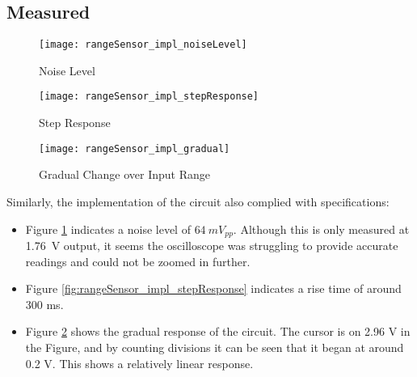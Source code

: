\subsection{Measured}

\begin{figure}[!htb]
    \centering
    \texttt{[image: rangeSensor\_impl\_noiseLevel]}
    \caption{Noise Level}
    \label{fig:rangeSensor_impl_noiseLevel}
\end{figure}

\begin{figure}[!htb]
    \centering
    \begin{minipage}{0.45\textwidth}
        \centering
        \texttt{[image: rangeSensor\_impl\_stepResponse]}
        \caption{Step Response}
        \label{fig:rangeSensor_impl_stepResponse}
    \end{minipage}
    \begin{minipage}{0.45\textwidth}
        \centering
        \texttt{[image: rangeSensor\_impl\_gradual]}
        \caption{Gradual Change over Input Range}
        \label{fig:rangeSensor_impl_gradual}
    \end{minipage}
\end{figure}

Similarly, the implementation of the circuit also complied with specifications:
\begin{itemize}
    \item Figure \ref{fig:rangeSensor_impl_noiseLevel} indicates a noise level of $\SI{64}{mV_{pp}}$. Although this is only measured at
          \SI{1.76}{V} output, it seems the oscilloscope was struggling to provide accurate readings and could not be zoomed in further.
    \item Figure \ref{fig:rangeSensor_impl_stepResponse} indicates a rise time of around 300 ms.
    \item Figure \ref{fig:rangeSensor_impl_gradual} shows the gradual response of the circuit. The cursor is on 2.96 V in the Figure, and
          by counting divisions it can be seen that it began at around 0.2 V. This shows a relatively linear response.
\end{itemize}